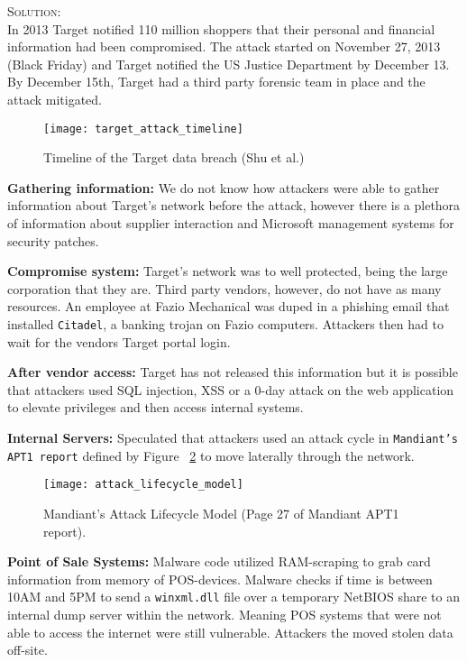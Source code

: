 \documentclass[12pt]{article}
\newenvironment{solution}
    {\textsc{Solution:}\\}
    {\newpage}%
\begin{document}
	\begin{solution}
		In 2013 Target notified 110 million shoppers that their personal and financial information
		had been compromised. The attack started on November 27, 2013 (Black Friday) and Target
		notified the US	Justice Department by December 13. By December 15th, Target had a third party
		forensic team in place and the attack mitigated.
		\begin{figure}[ht!]
			\centering
			\texttt{[image: target\_attack\_timeline]}
			\caption{Timeline of the Target data breach (Shu et al.)}
			\label{fig:timeline}
		\end{figure}
		\textbf{Gathering information:} We do not know how attackers were able to gather information
		about Target's network before the attack, however there is a plethora of information about
		supplier interaction and Microsoft management systems for security patches.

		\textbf{Compromise system:} Target's network was to well protected, being the large
		corporation that they are. Third party vendors, however, do not have as many resources.
		An employee at Fazio Mechanical was duped in a phishing email that installed \texttt{Citadel},
		a banking trojan on Fazio computers. Attackers then had to wait for the vendors Target
		portal login.

		\textbf{After vendor access:} Target has not released this information but it is possible that
		attackers used SQL injection, XSS or a 0-day attack on the web application to elevate
		privileges and then access internal systems.

		\textbf{Internal Servers:} Speculated that attackers used an attack cycle
		in \texttt{Mandiant's APT1 report} defined by Figure ~\ref{fig:attack_lifecycle_model} to move laterally through the network.
		\begin{figure}[ht!]
			\centering
			\texttt{[image: attack\_lifecycle\_model]}
			\caption{Mandiant's Attack Lifecycle Model (Page 27 of Mandiant APT1 report).}
			\label{fig:attack_lifecycle_model}
		\end{figure}
		
		\textbf{Point of Sale Systems:} Malware code utilized RAM-scraping to grab card information
		from memory of POS-devices. Malware checks if time is between 10AM and 5PM to send
		a \texttt{winxml.dll} file over a temporary NetBIOS share to an internal dump server
		within the network. Meaning POS systems that were not able to access the internet
		were still vulnerable. Attackers the moved stolen data off-site.


\end{solution}
\end{document}
